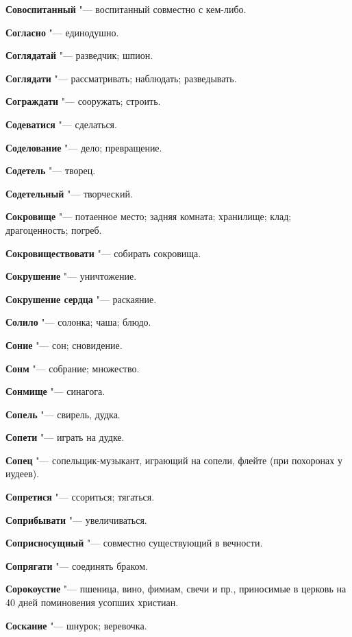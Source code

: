 \begin{mymulticols}
\noindent\textbf{Совоспитанный} "--- воспитанный совместно с кем-либо. 

\noindent\textbf{Согласно} "--- единодушно. 

\noindent\textbf{Соглядатай} "--- разведчик; шпион. 

\noindent\textbf{Соглядати} "--- рассматривать; наблюдать; разведывать. 

\noindent\textbf{Сограждати} "--- сооружать; строить. 

\noindent\textbf{Содеватися} "--- сделаться. 

\noindent\textbf{Соделование} "--- дело; превращение. 

\noindent\textbf{Содетель} "--- творец. 

\noindent\textbf{Содетельный} "--- творческий. 

\noindent\textbf{Сокровище} "--- потаенное место; задняя комната; хранилище; клад; драгоценность; погреб. 

\noindent\textbf{Сокровиществовати} "--- собирать сокровища. 

\noindent\textbf{Сокрушение} "--- уничтожение. 

\noindent\textbf{Сокрушение сердца} "--- раскаяние. 

\noindent\textbf{Солило} "--- солонка; чаша; блюдо. 

\noindent\textbf{Соние} "--- сон; сновидение. 

\noindent\textbf{Сонм} "--- собрание; множество. 

\noindent\textbf{Сонмище} "--- синагога. 

\noindent\textbf{Сопель} "--- свирель, дудка. 

\noindent\textbf{Сопети} "--- играть на дудке. 

\noindent\textbf{Сопец} "--- сопельщик-музыкант, играющий на сопели, флейте (при похоронах у иудеев). 

\noindent\textbf{Сопретися} "--- ссориться; тягаться. 

\noindent\textbf{Соприбывати} "--- увеличиваться. 

\noindent\textbf{Соприсносущный} "--- совместно существующий в вечности. 

\noindent\textbf{Сопрягати} "--- соединять браком. 

\noindent\textbf{Сорокоустие} "--- пшеница, вино, фимиам, свечи и пр., приносимые в церковь на 40 дней поминовения усопших христиан. 

\noindent\textbf{Соскание} "--- шнурок; веревочка. 


\end{mymulticols}
